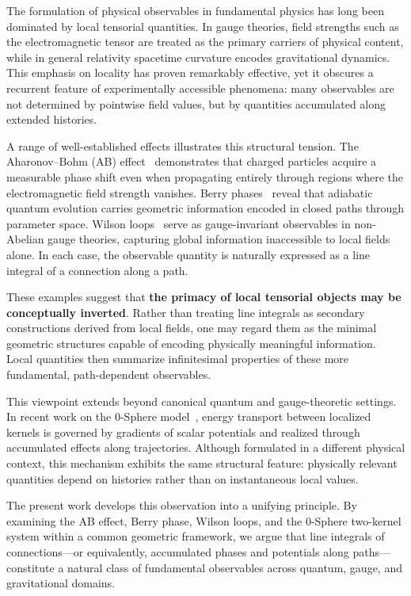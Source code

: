 \documentclass[%
 reprint,
 amsmath,amssymb,
 aps,
 prb,
]{revtex4-2}
\numberwithin{equation}{section}
\begin{document}
The formulation of physical observables in fundamental physics has long been dominated by local tensorial quantities. In gauge theories, field strengths such as the electromagnetic tensor are treated as the primary carriers of physical content, while in general relativity spacetime curvature encodes gravitational dynamics. This emphasis on locality has proven remarkably effective, yet it obscures a recurrent feature of experimentally accessible phenomena: many observables are not determined by pointwise field values, but by quantities accumulated along extended histories.

A range of well-established effects illustrates this structural tension. The Aharonov--Bohm (AB) effect~\cite{AharonovBohm1959,WuYang1975} demonstrates that charged particles acquire a measurable phase shift even when propagating entirely through regions where the electromagnetic field strength vanishes. Berry phases~\cite{Berry1984} reveal that adiabatic quantum evolution carries geometric information encoded in closed paths through parameter space. Wilson loops~\cite{Wilson1974} serve as gauge-invariant observables in non-Abelian gauge theories, capturing global information inaccessible to local fields alone. In each case, the observable quantity is naturally expressed as a line integral of a connection along a path.

These examples suggest that \textbf{the primacy of local tensorial objects may be conceptually inverted}. Rather than treating line integrals as secondary constructions derived from local fields, one may regard them as the minimal geometric structures capable of encoding physically meaningful information. Local quantities then summarize infinitesimal properties of these more fundamental, path-dependent observables.

This viewpoint extends beyond canonical quantum and gauge-theoretic settings. In recent work on the 0-Sphere model~\cite{hanamura17765017,hanamura18064535}, energy transport between localized kernels is governed by gradients of scalar potentials and realized through accumulated effects along trajectories. Although formulated in a different physical context, this mechanism exhibits the same structural feature: physically relevant quantities depend on histories rather than on instantaneous local values.

The present work develops this observation into a unifying principle. By examining the AB effect, Berry phase, Wilson loops, and the 0-Sphere two-kernel system within a common geometric framework, we argue that line integrals of connections---or equivalently, accumulated phases and potentials along paths---constitute a natural class of fundamental observables across quantum, gauge, and gravitational domains.
\end{document}
